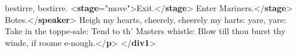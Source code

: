 \begin{shaded}
\hspace*{1em}\hspace*{1em}\hspace*{1em}\hspace*{1em}\hspace*{1em}\hspace*{1em} bestirre, bestirre. {<\textbf{stage}\hspace*{1em}{type}="{move}">}Exit.{</\textbf{stage}>}\mbox{}\newline 
\hspace*{1em}\hspace*{1em}\mbox{}\newline 
\hspace*{1em}\mbox{}\newline 
\hspace*{1em}Enter Mariners.{</\textbf{stage}>}\mbox{}\newline 
\hspace*{1em}\mbox{}\newline 
\hspace*{1em}\hspace*{1em}Botes.{</\textbf{speaker}>}\mbox{}\newline 
\hspace*{1em}\hspace*{1em}Heigh my hearts, cheerely, cheerely my harts: yare,\mbox{}\newline 
\hspace*{1em}\hspace*{1em}\hspace*{1em}\hspace*{1em}\hspace*{1em}\hspace*{1em} yare: Take in the toppe-sale: Tend to th' Masters whistle:\mbox{}\newline 
\hspace*{1em}\hspace*{1em}\hspace*{1em}\hspace*{1em}\hspace*{1em}\hspace*{1em} Blow till thou burst thy winde, if roome e-nough.{</\textbf{p}>}\mbox{}\newline 
\hspace*{1em}\mbox{}\newline 
{}\mbox{}\newline 
{</\textbf{div1}>}\end{shaded}\egroup\par \par
